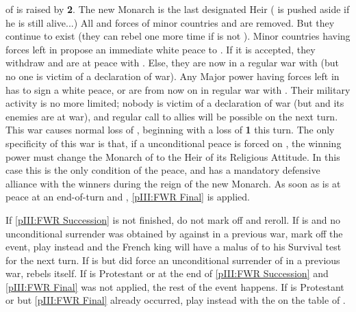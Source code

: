 \begin{digressions}
  \phinter
  \aparag \STAB of \FRA is raised by {\bf 2}.
  \aparag The new Monarch is the last designated Heir ( is
  pushed aside if he is still alive...)
  \aparag All \REVOLT and forces of minor countries \hug and \lig are
  removed. But they continue to exist (they can rebel one more time if \FRA is
  not \CATHCO).
  \bparag Minor countries having forces left in \FRA propose an immediate
  white peace to \FRA. If it is accepted, they withdraw and are at peace with
  \FRA. Else, they are now in a regular war with \FRA (but no one is victim of
  a declaration of war).
  \bparag Any Major power having forces left in \FRA has to sign a white
  peace, or are from now on in regular war with \FRA.  Their military activity
  is no more limited; nobody is victim of a declaration of war (but \FRA and
  its enemies are at war), and regular call to allies will be possible on the
  next turn.  This war causes normal loss of \STAB, beginning with a loss of
  {\bf 1} \STAB this turn.
  \bparag The only specificity of this war is that, if a unconditional peace
  is forced on \FRA, the winning power must change the Monarch of \FRA to the
  Heir of its Religious Attitude.  In this case this is the only condition of
  the peace, and \FRA has a mandatory defensive alliance with the winners
  during the reign of the new Monarch.
  \aparag As soon as \FRA is at peace at an end-of-turn and \CATHCO,
  \ref{pIII:FWR Final} is applied.
\end{digressions}





\condition{}
\aparag If \ref{pIII:FWR Succession} is not finished, do not mark off and
reroll.
\aparag If \FRA is \CATHCO and no unconditional surrender was obtained by \FRA
against \hug in a previous war, mark off the event, play \RD instead and the
French king will have a malus of  to his Survival test for the next
turn.
\aparag If \FRA is \CATHCO but did force an unconditional surrender of \hug in
a previous war, \hug rebels itself.
\aparag If \FRA is Protestant or \CATHCR at the end of \ref{pIII:FWR
  Succession} and \ref{pIII:FWR Final} was not applied, the rest of the event
happens.
\aparag If \FRA is Protestant or \CATHCR but \ref{pIII:FWR Final} already
occurred, play \RD instead with the \REVOLT on the table of \FRA.

